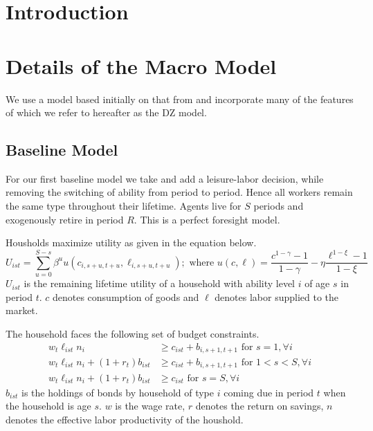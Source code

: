 \documentclass[letterpaper,12pt]{article}
\theoremstyle{definition}
\numberwithin{equation}{section}
\begin{document}
\begin{spacing}{1.5}


\section{Introduction}\label{SecIntro}

\section{Details of the Macro Model}\label{SecMacro}

  We use a model based initially on that from \citet{EvansPhillips2014} and incorporate many of the features of \citet{ZodrowDiamond:2013} which we refer to hereafter as the DZ model.

  \subsection{Baseline Model}
    For our first baseline model we take \citet{EvansPhillips2014} and add a leisure-labor decision, while removing the switching of ability from period to period.  Hence all workers remain the same type throughout their lifetime.  Agents live for $S$ periods and exogenously retire in period $R$.  This is a perfect foresight model.

    Housholds maximize utility as given in the equation below.
    \begin{equation}
    U_{ist} = \sum_{u=0}^{S-s}\beta^u u(c_{i,s+u,t+u},\ell_{i,s+u,t+u});\text{ where }u(c,\ell) = \frac{c^{1-\gamma}-1}{1-\gamma} - \eta \frac{\ell^{1-\xi}-1}{1-\xi}
    \end{equation}
    $U_{ist}$ is the remaining lifetime utility of a household with ability level $i$ of age $s$ in period $t$.  $c$ denotes consumption of goods and $\ell$ denotes labor supplied to the market.

    The household faces the following set of budget constraints.
    \begin{align}
    w_t \ell_{ist} n_i & \ge c_{ist} + b_{i,s+1,t+1} \text{     for } s=1,\forall i \\
    w_t \ell_{ist} n_i + (1+r_t)b_{ist} & \ge c_{ist} + b_{i,s+1,t+1} \text{     for } 1<s<S,\forall i \\
    w_t \ell_{ist} n_i + (1+r_t)b_{ist} & \ge c_{ist} \text{     for } s=S,\forall i
    \end{align}
    $b_{ist}$ is the holdings of bonds by household of type $i$ coming due in period $t$ when the household is age $s$. $w$ is the wage rate, $r$ denotes the return on savings, $n$ denotes the effective labor productivity of the houshold.


\end{spacing}
\end{document}
